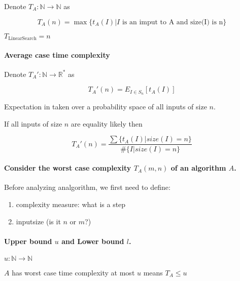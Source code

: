 \documentclass[
]{article}
\def\N {{\mathbb N}}
\renewcommand{\N}{\mathbb{N}}
\newcommand{\R}{\mathbb{R}}
\begin{document}
Denote \(T_A: \N\to \N\) as

\[T_A(n) = \max\{t_A(I)|I \mbox{ is an imput to A and size(I) is n} \}\]

\(T_{\mbox{LinearSearch}} = n\)

\hypertarget{average-case-time-complexity}{%
\paragraph{Average case time
complexity}\label{average-case-time-complexity}}

Denote \(T_A': \N\to \R^*\) as

\[T_A'(n) = E_{I\in S_n}[t_A(I)]\]

Expectation in taken over a probability space of all inputs of
size \(n\).

If all inputs of size \(n\) are equality likely then

\[T_A'(n) = \frac{\sum\{t_A(I)|size(I) =n \}}{\#\{I|size(I) =n \}}\]

\hypertarget{consider-the-worst-case-complexity-uxatuxaauxauxamuxauxanuxauxa-of-an-algorithm-uxaauxa}{%
\paragraph{\texorpdfstring{Consider the worst case complexity
\(T_A(m,n)\) of an algorithm
\(A\).}{Consider the worst case complexity T\_A(m,n) of an algorithm A.}}\label{consider-the-worst-case-complexity-uxatuxaauxauxamuxauxanuxauxa-of-an-algorithm-uxaauxa}}

Before analyzing analgorithm, we first need to define:

\begin{enumerate}
\def\labelenumi{\arabic{enumi}.}
\item
  complexity measure: what is a step
\item
  inputsize (is it \(n\) or \(m\)?)
\end{enumerate}

\hypertarget{upper-bound-uxauuxa-and-lower-bound-uxaluxa}{%
\paragraph{\texorpdfstring{Upper bound \(u\) and Lower bound
\(l\).}{Upper bound u and Lower bound l.}}\label{upper-bound-uxauuxa-and-lower-bound-uxaluxa}}

\(u: \N\to \N\)

\(A\) has worst case time complexity at most \(u\) means \(T_A\leq u\)
\end{document}
